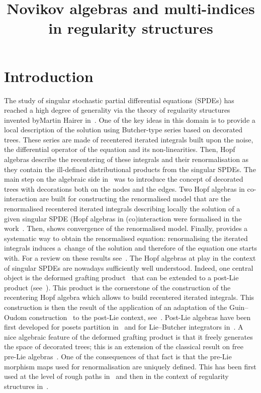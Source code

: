 \documentclass[AHL,Unicode,longabstracts]{cedram}
\title[Novikov algebras and multi-indices in regularity structures]{Novikov algebras and multi-indices in regularity structures}
\author[\initial{Y.} \lastname{Bruned}]{\firstname{Yvain} \lastname{Bruned}}
\author[\initial{V.} \lastname{Dotsenko}]{\firstname{Vladimir} \lastname{Dotsenko}}
\begin{document}
\maketitle

\section{Introduction}


The study of singular stochastic partial differential equations (SPDEs) has reached a high degree of generality via the theory of regularity structures invented by\linebreak Martin Hairer in~\cite{reg}. One of the key ideas in this domain is to provide a local description of the solution using Butcher-type series based on decorated trees. These series are made of recentered iterated integrals built upon the noise, the differential operator of the equation and its non-linearities. Then, Hopf algebras describe the recentering of these integrals and their renormalisation as they contain the ill-defined distributional products from the singular SPDEs. The main step on the algebraic side in~\cite{BHZ} was to introduce the concept of decorated trees with decorations both on the nodes and the edges. Two Hopf algebras in co-interaction are built for constructing the renormalised model that are the renormalised recentered iterated integrals describing locally the solution of a given singular SPDE (Hopf algebras in (co)interaction were formalised in the work~\cite{CEFM11}. Then, \cite{CH16} shows convergence of the renormalised model. Finally, \cite{BCCH} provides a systematic way to obtain the renormalised equation: renormalising the iterated integrals induces a~change of the solution and therefore of the equation one starts with. For a review on these results see~\cite{BaiHos,FrizHai}. The Hopf algebras at play in the context of singular SPDEs are nowadays sufficiently well understood. Indeed, one central object is the deformed grafting product~\cite{BCCH,BM22} that can be extended to a post-Lie product (see~\cite{BK23}). This product is the cornerstone of the construction of the recentering Hopf algebra which allows to build recentered iterated integrals. This construction is then the result of the application of an adaptation of the Guin--Oudom construction~\cite{Guin1,Guin2} to the post-Lie context, see~\cite{ELM}. Post-Lie algebras have been first developed for posets partition in~\cite{Val} and for Lie--Butcher integrators in~\cite{ML08,ML13}. A nice algebraic feature of the deformed grafting product is that it freely generates the space of decorated trees; this is an extension of the classical result on free pre-Lie algebras~\cite{ChaLiv}. One of the consequences of that fact is that the pre-Lie morphism maps used for renormalisation are uniquely defined. This has been first used at the level of rough paths in~\cite{BCFP} and then in the context of regularity structures in~\cite{BCCH}.
\end{document}
